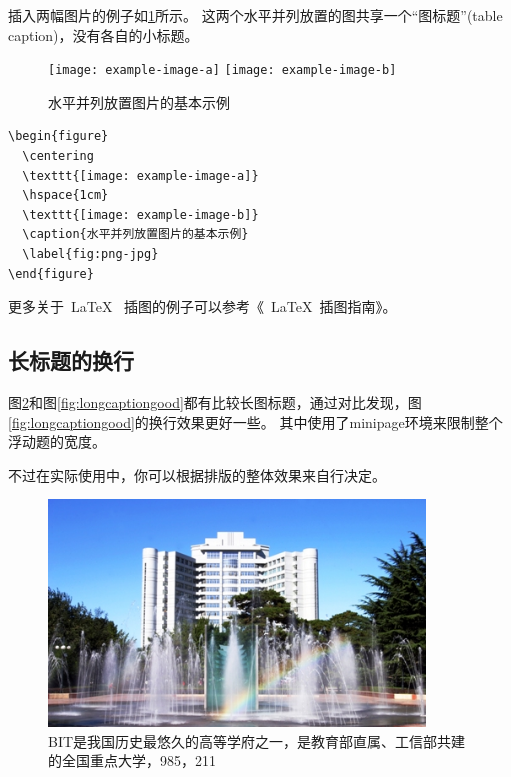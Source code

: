 插入两幅图片的例子如\ref{fig:png-jpg}所示。
这两个水平并列放置的图共享一个``图标题''(table caption)，没有各自的小标题。

\begin{figure}
  \centering
  \texttt{[image: example-image-a]}
  \hspace{1cm}
  \texttt{[image: example-image-b]}
  \caption{水平并列放置图片的基本示例}
  \label{fig:png-jpg}
\end{figure}

\begin{lstlisting}[language={[LaTeX]TeX}, caption={插入PNG/JPG}]
\begin{figure}
  \centering
  \texttt{[image: example-image-a]}
  \hspace{1cm}
  \texttt{[image: example-image-b]}
  \caption{水平并列放置图片的基本示例}
  \label{fig:png-jpg}
\end{figure}
\end{lstlisting}

更多关于~\LaTeX~ 插图的例子可以参考《~\LaTeX~插图指南》。

\subsection{长标题的换行}
\label{sec:longcaption}

图\ref{fig:longcaptionbad}和图\ref{fig:longcaptiongood}都有比较长图标题，通过对比发现，图\ref{fig:longcaptiongood}的换行效果更好一些。
其中使用了minipage环境来限制整个浮动题的宽度。

不过在实际使用中，你可以根据排版的整体效果来自行决定。

\begin{figure}
 \centering
 \includegraphics[width=10cm]{figures/pic1}
 \caption{BIT是我国历史最悠久的高等学府之一，是教育部直属、工信部共建的全国重点大学，985，211}
 \label{fig:longcaptionbad}
\end{figure}

